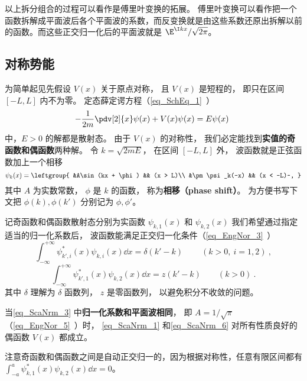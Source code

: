 以上拆分组合的过程可以看作是傅里叶变换的拓展。 傅里叶变换可以看作把一个函数拆解成平面波后各个平面波的系数，而反变换就是由这些系数还原出拆解以前的函数。而这些正交归一化后的平面波就是 $\E^{\I k x}/\sqrt{2\pi}$。

\subsection{对称势能}
为简单起见先假设 $V(x)$ 关于原点对称， 且 $V(x)$ 是短程的， 即只在区间 $[-L,L]$ 内不为零。 定态薛定谔方程（\autoref{eq_SchEq_1}~）
\begin{equation}
-\frac{1}{2m}\pdv[2]{x}\psi(x) + V(x)\psi(x) = E\psi(x)~
\end{equation}
中，$E > 0$ 的解都是散射态。 由于 $V(x)$ 的对称性， 我们必定能找到\textbf{实值的奇函数和偶函数}两种解。 令 $k = \sqrt{2mE}$， 在区间 $[-L,L]$ 外， 波函数就是正弦函数加上一个相移
\begin{equation}\label{eq_ScaNrm_3}
\psi_k(x) = \leftgroup{
&A\sin(kx + \phi) && (x > L)\\
&\pm \psi_k(-x) && (x < -L)~,
}\end{equation}
其中 $A$ 为实数常数， $\phi$ 是 $k$ 的函数， 称为\textbf{相移（phase shift）}。 为方便书写下文把 $\phi(k),\phi(k')$ 分别记为 $\phi, \phi'$。

记奇函数和偶函数散射态分别为实函数 $\psi_{k,1}(x)$ 和 $\psi_{k,2}(x)$ 我们希望通过指定适当的归一化系数后， 波函数能满足正交归一化条件（\autoref{eq_EngNor_3}~）
\begin{equation}\label{eq_ScaNrm_1}
\int_{-\infty}^{+\infty} \psi_{k',i}^*(x) \psi_{k,i}(x) \dd{x} = \delta(k' - k)~\qquad (k > 0,\ i = 1, 2)~,
\end{equation}
\begin{equation}\label{eq_ScaNrm_6}
\int_{-\infty}^{+\infty} \psi_{k',1}^*(x) \psi_{k,2}(x) \dd{x} = z(k' - k) \qquad (k > 0)~.
\end{equation}
其中 $\delta$ 理解为 $\delta$ 函数列， $z$ 是零函数列， 以避免积分不收敛的问题。

\begin{theorem}{}\label{the_ScaNrm_1}
当\autoref{eq_ScaNrm_3} 中\textbf{归一化系数和平面波相同}， 即 $A = 1/\sqrt{\pi}$（\autoref{eq_EngNor_5}~）时， \autoref{eq_ScaNrm_1} 和\autoref{eq_ScaNrm_6} 对所有性质良好的偶函数 $V(x)$ 都成立。
\end{theorem}
注意奇函数和偶函数之间是自动正交归一的，因为根据对称性，任意有限区间都有 $\int_{-a}^{a} \psi_{k,1}^*(x) \psi_{k,2}(x) \dd{x} = 0$。

